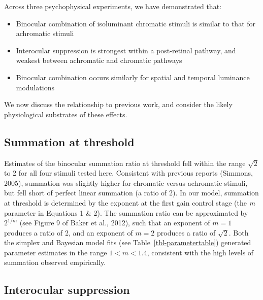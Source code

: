\documentclass[
  letterpaper,
  DIV=11,
  numbers=noendperiod]{scrartcl}
\providecommand{\tightlist}{%
  \setlength{\itemsep}{0pt}\setlength{\parskip}{0pt}}\usepackage{longtable,booktabs,array}
\begin{document}
Across three psychophysical experiments, we have demonstrated that:

\begin{itemize}
\tightlist
\item
  Binocular combination of isoluminant chromatic stimuli is similar to
  that for achromatic stimuli
\item
  Interocular suppression is strongest within a post-retinal pathway,
  and weakest between achromatic and chromatic pathways
\item
  Binocular combination occurs similarly for spatial and temporal
  luminance modulations
\end{itemize}

We now discuss the relationship to previous work, and consider the
likely physiological substrates of these effects.

\hypertarget{summation-at-threshold}{%
\subsection{Summation at threshold}\label{summation-at-threshold}}

Estimates of the binocular summation ratio at threshold fell within the
range \(\sqrt{2}\) to 2 for all four stimuli tested here. Consistent
with previous reports (Simmons, 2005), summation was slightly higher for
chromatic versus achromatic stimuli, but fell short of perfect linear
summation (a ratio of 2). In our model, summation at threshold is
determined by the exponent at the first gain control stage (the \emph{m}
parameter in Equations 1 \& 2). The summation ratio can be approximated
by \(2^{1/m}\) (see Figure 9 of Baker et al., 2012), such that an
exponent of \(m=1\) produces a ratio of 2, and an exponent of \(m = 2\)
produces a ratio of \(\sqrt{2}\). Both the simplex and Bayesian model
fits (see Table~\ref{tbl-parametertable}) generated parameter estimates
in the range \(1 < m < 1.4\), consistent with the high levels of
summation observed empirically.

\hypertarget{interocular-suppression}{%
\subsection{Interocular suppression}\label{interocular-suppression}}
\end{document}
